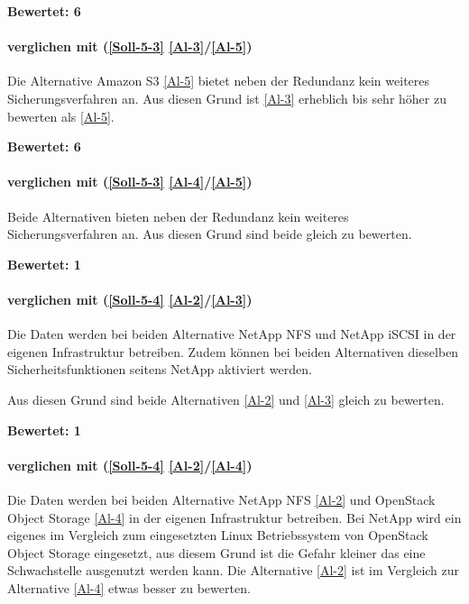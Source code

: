 \textbf{Bewertet: 6}

\paragraph*{  verglichen mit  (\ref{Soll-5-3} \ref{Al-3}/\ref{Al-5})}
Die Alternative Amazon S3 \ref{Al-5} bietet neben der Redundanz kein weiteres Sicherungsverfahren an. Aus diesen Grund ist  \ref{Al-3} erheblich bis sehr höher zu bewerten als  \ref{Al-5}.

\textbf{Bewertet: 6}


\paragraph*{  verglichen mit  (\ref{Soll-5-3} \ref{Al-4}/\ref{Al-5})}
Beide Alternativen bieten neben der Redundanz kein weiteres Sicherungsverfahren an. Aus diesen Grund sind beide gleich zu bewerten.

\textbf{Bewertet: 1}

\paragraph*{  verglichen mit  (\ref{Soll-5-4} \ref{Al-2}/\ref{Al-3})}
Die Daten werden bei beiden Alternative NetApp NFS und NetApp iSCSI in der eigenen Infrastruktur betreiben. Zudem können bei beiden Alternativen dieselben Sicherheitsfunktionen seitens NetApp aktiviert werden.

Aus diesen Grund sind beide Alternativen  \ref{Al-2} und  \ref{Al-3} gleich zu bewerten.

\textbf{Bewertet: 1}

\paragraph*{  verglichen mit  (\ref{Soll-5-4} \ref{Al-2}/\ref{Al-4})}
Die Daten werden bei beiden Alternative NetApp NFS \ref{Al-2} und OpenStack Object Storage \ref{Al-4} in der eigenen Infrastruktur betreiben. Bei NetApp wird ein eigenes im Vergleich zum eingesetzten Linux Betriebssystem von OpenStack Object Storage eingesetzt, aus diesem Grund ist die Gefahr kleiner das eine Schwachstelle ausgenutzt werden kann.
Die Alternative  \ref{Al-2} ist im Vergleich zur Alternative  \ref{Al-4} etwas besser zu bewerten.

